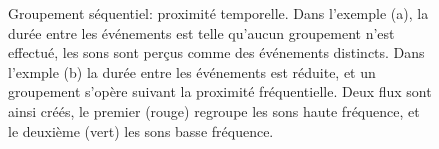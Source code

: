 \begin{figure}[bth]
        \myfloatalign
        \caption[Groupement séquentiel : proximité temporelle.]{Groupement séquentiel: proximité temporelle. Dans l'exemple (a), la durée entre les événements est telle qu'aucun groupement n'est effectué, les sons sont perçus comme des événements distincts. Dans l'exmple (b) la durée entre les événements est réduite, et un groupement s'opère suivant la proximité fréquentielle. Deux flux sont ainsi créés, le premier (rouge) regroupe les sons haute fréquence, et le deuxième (vert) les sons basse fréquence.}\label{fig:tonesim}
\end{figure}

